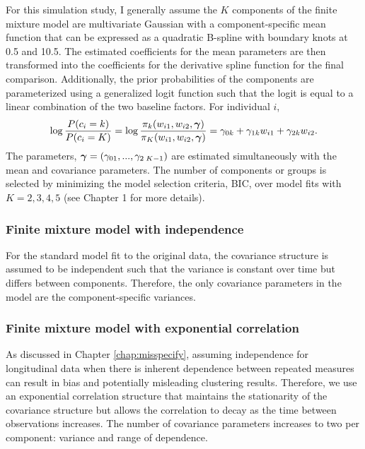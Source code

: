 For this simulation study, I generally assume the $K$ components of the finite mixture model are multivariate Gaussian with a component-specific mean function that can be expressed as a quadratic B-spline with boundary knots at 0.5 and 10.5. The estimated coefficients for the mean parameters are then transformed into the coefficients for the derivative spline function for the final comparison. Additionally, the prior probabilities of the components are parameterized using a generalized logit function such that the logit is equal to a linear combination of the two baseline factors. For individual $i$, 
$$\log\frac{P(c_{i}=k)}{P(c_{i}=K)} = \log\frac{\pi_{k}(w_{i1},w_{i2},\boldsymbol\gamma)}{\pi_{K}(w_{i1},w_{i2},\boldsymbol\gamma)} =  \gamma_{0k}+\gamma_{1k}w_{i1}+\gamma_{2k}w_{i2}.$$
The parameters, $\boldsymbol\gamma=(\gamma_{01},...,\gamma_{2\; K-1})$ are estimated simultaneously with the mean and covariance parameters. 
The number of components or groups is selected by minimizing the model selection criteria, BIC, over model fits with $K=2,3,4,5$ (see Chapter 1 for more details). 

\subsubsection{Finite mixture model with independence}
For the standard model fit to the original data, the covariance structure is assumed to be independent such that the variance is constant over time but differs between components. Therefore, the only covariance parameters in the model are the component-specific variances.

\subsubsection{Finite mixture model with exponential correlation}
As discussed in Chapter \ref{chap:misspecify}, assuming independence for longitudinal data when there is inherent dependence between repeated measures can result in bias and potentially misleading clustering results. Therefore, we use an exponential correlation structure that maintains the stationarity of the covariance structure but allows the correlation to decay as the time between observations increases. The number of covariance parameters increases to two per component: variance and range of dependence. 

